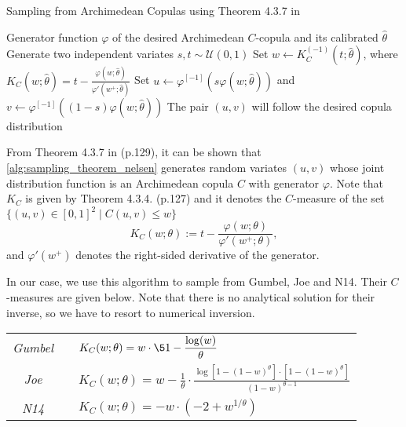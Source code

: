 
\begin{algorithm}[H]
\caption{Sampling from Archimedean Copulas using Theorem 4.3.7 in \cite{Nelsen2006}}
\label{alg:sampling_theorem_nelsen}
\begin{algorithmic}[1]
\Require Generator function $\varphi$ of the desired Archimedean $C$-copula and its calibrated $\hat \theta$
\State Generate two independent variates $s,t\sim\mathcal U(0,1)$
\State Set $w \gets K_C^{(-1)}(t;\hat \theta)$, where 
$\displaystyle K_C(w;\hat \theta) = t - \frac{\varphi(w;\hat \theta)}{\varphi'(w^+;\hat \theta)}$
\State Set $u \gets \varphi^{[-1]}(s\varphi(w;\hat \theta))$ and $v \gets \varphi^{[-1]}((1-s)\varphi(w;\hat \theta))$
\Ensure The pair $(u,v)$ will follow the desired copula distribution
\end{algorithmic}
\end{algorithm}
From Theorem 4.3.7 in \cite{Nelsen2006} (p.129), it can be shown that \cref{alg:sampling_theorem_nelsen} generates random variates $(u,v)$ whose joint distribution function is an Archimedean copula $C$ with generator $\varphi$. %
Note that $K_C$ is given by Theorem 4.3.4. (p.127) and it denotes the $C$-measure of the set $\{(u,v)\in [0,1]^2 \mid C(u,v)\leq w\}$
$$
K_C(w; \theta) := t - \frac{\varphi(w; \theta)}{\varphi'(w^+; \theta)},
$$ 
and ${\varphi'(w^+)}$ denotes the right-sided derivative of the generator.

In our case, we use this algorithm to sample from Gumbel, Joe and N14. Their $C$-measures are given  below. Note that there is no analytical solution for their inverse, so we have to resort to numerical inversion.

\vspace{0.2cm}
{\centering
\renewcommand{\arraystretch}{1.8}  
\begin{tabular}{ccp{10cm}}
\textit{Gumbel} && $\displaystyle K_C(w; \theta)=w \cdot \5{1- \frac{\log (w)}{\theta}}$ 
\\
\textit{Joe} && $\displaystyle K_C(w; \theta) = w - \frac{1}{\theta} 
\cdot 
\frac{\log[1-(1-w)^{\theta}] \cdot [1-(1-w)^{\theta}]}
{(1-w)^{\theta-1}}$ 
\\
\textit{N14} && $\displaystyle K_C(w; \theta) = -w \cdot (-2 + w^{1/\theta})$ 
\\
\end{tabular}
\par}


